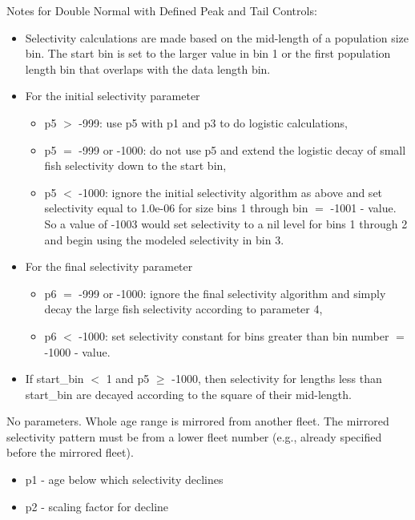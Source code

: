 Notes for Double Normal with Defined Peak and Tail Controls:
	\begin{itemize}
		\item Selectivity calculations are made based on the mid-length of a population size bin. The start bin is set to the larger value in bin 1 or the first population length bin that overlaps with the data length bin.
		\item For the initial selectivity parameter
		\begin{itemize}
			\item p5 $>$ -999: use p5 with p1 and p3 to do logistic calculations,
			\item p5 $=$ -999 or -1000: do not use p5 and extend the logistic decay of small fish selectivity down to the start bin,
			\item p5 $<$ -1000: ignore the initial selectivity algorithm as above and set selectivity equal to 1.0e-06 for size bins 1 through bin $=$ -1001 - value. So a value of -1003 would set selectivity to a nil level for bins 1 through 2 and begin using the modeled selectivity in bin 3.
		\end{itemize}
		\item For the final selectivity parameter
		\begin{itemize}
			\item p6 $=$ -999 or -1000: ignore the final selectivity algorithm and simply decay the large fish selectivity according to parameter 4,
			\item p6 $<$ -1000: set selectivity constant for bins greater than bin number $=$ -1000 - value.
		\end{itemize}
		\item If start\_bin $<$ 1 and p5 $\geq$ -1000, then selectivity for lengths less than start\_bin are decayed according to the square of their mid-length.
	\end{itemize}

No parameters. Whole age range is mirrored from another fleet. The mirrored selectivity pattern must be from a lower fleet number (e.g., already specified before the mirrored fleet).

	\begin{itemize}
		\item p1 - age below which selectivity declines
		\item p2 - scaling factor for decline
	\end{itemize}


